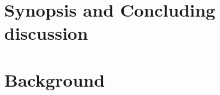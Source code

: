 



\maketitle%

\tableofcontents{}

\setcounter{chapter}{-1}
\chapter{Synopsis and Concluding discussion}
\clearpage

\clearpage



\chapter{Background}\label{chapter:stringdiagrams}

\clearpage
\label{sec:proctheory}







